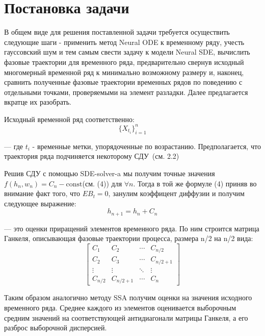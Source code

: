\documentclass{article}
\begin{document}
\section{Постановка задачи}
   
   \par В общем виде для решения поставленной задачи требуется осуществить следующие шаги - применить метод Neural ODE к временному ряду, учесть гауссовский шум и тем самым свести задачу к модели Neural SDE, вычислить фазовые траектории для временного ряда, предварительно свернув исходный многомерный временной ряд к минимально возможному размеру и, наконец, сравнить полученные фазовые траектории временных рядов по поведению с отдельными точками, проверяемыми на элемент разладки. Далее предлагается вкратце их разобрать.
   \par Исходный временной ряд соответственно: \begin{equation}\{X_{t_i}\}_{i=1}^n \end{equation} \par --- где $t_i$ - временные метки, упорядоченные по возрастанию. Предполагается, что траектория ряда подчиняется некоторому СДУ~(см. 2.2)
   \par Решив СДУ с помощью SDE-solver-a мы получим точные значения $f(h_n,w_n)= C_n-\text{const}$(см. (4)) для $\forall n$. Тогда в той же формуле (4) приняв во внимание факт того, что $E B_t=0$, занулим коэффицент диффузии и получим следующее выражение:
   \begin{equation} h_{n+1} = h_n + C_n    \end{equation}
   \par --- это оценки приращений элементов временного ряда. По ним строится матрица Ганкеля, описывающая фазовые траектории процесса, размера n/2 на n/2 вида:
    \begin{equation}
 \begin{bmatrix}
   C_1 & C_2 & \cdots & C_{n/2} \\
   C_2 & C_3 & \cdots & C_{n/2+1} \\
   \vdots  & \vdots  & \ddots & \vdots  \\
   C_{n/2} & C_{n/2+1} & \cdots & C_{n} 
 \end{bmatrix}
\end{equation}
   \par Таким образом аналогично методу SSA получим оценки на значения исходного временного ряда. Среднее каждого из элементов оценивается выборочным средним значений на соответствующей антидиагонали матрицы Ганкеля, а его разброс выборочной дисперсией.
   
\end{document}

